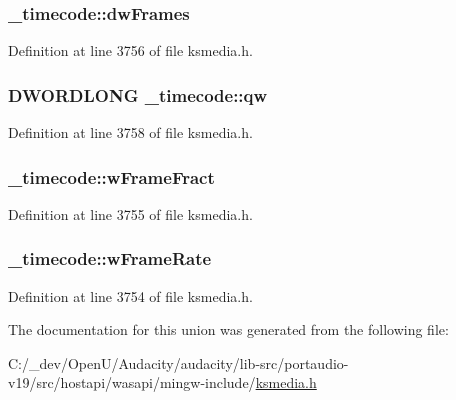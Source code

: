 \subsubsection[{\texorpdfstring{dw\+Frames}{dwFrames}}]{ \+\_\+timecode\+::dw\+Frames}\hypertarget{union__timecode_a09c86295eb935c1632398c963b156886}{}\label{union__timecode_a09c86295eb935c1632398c963b156886}


Definition at line 3756 of file ksmedia.\+h.

\subsubsection[{\texorpdfstring{qw}{qw}}]{\setlength{\rightskip}{0pt plus 5cm}D\+W\+O\+R\+D\+L\+O\+NG \+\_\+timecode\+::qw}\hypertarget{union__timecode_a1ae00c82e84c948d21717ebb5455c599}{}\label{union__timecode_a1ae00c82e84c948d21717ebb5455c599}


Definition at line 3758 of file ksmedia.\+h.

\subsubsection[{\texorpdfstring{w\+Frame\+Fract}{wFrameFract}}]{ \+\_\+timecode\+::w\+Frame\+Fract}\hypertarget{union__timecode_aca27e63a70401a534265368843641277}{}\label{union__timecode_aca27e63a70401a534265368843641277}


Definition at line 3755 of file ksmedia.\+h.

\subsubsection[{\texorpdfstring{w\+Frame\+Rate}{wFrameRate}}]{ \+\_\+timecode\+::w\+Frame\+Rate}\hypertarget{union__timecode_a776934cf1779e23fb01e43b96e530e58}{}\label{union__timecode_a776934cf1779e23fb01e43b96e530e58}


Definition at line 3754 of file ksmedia.\+h.



The documentation for this union was generated from the following file\+:\begin{DoxyCompactItemize}
\item 
C\+:/\+\_\+dev/\+Open\+U/\+Audacity/audacity/lib-\/src/portaudio-\/v19/src/hostapi/wasapi/mingw-\/include/\hyperlink{ksmedia_8h}{ksmedia.\+h}\end{DoxyCompactItemize}
